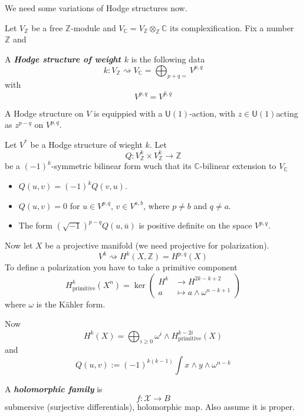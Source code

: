 We need some variations of Hodge structures now.

Let $V_{\mathbb{Z}}$ be a free $\mathbb{Z}$-module and $V_{\mathbb{C}}=V_{\mathbb{Z}}\otimes_{\mathbb{Z}}\mathbb{C}$ its complexification. Fix a number $\mathbb{Z}$ and

\begin{defn}\leavevmode
	A \textit{\textbf{Hodge structure of weight $k$}} is the following data
	\[k:V_\mathbb{Z}\rightsquigarrow V_{\mathbb{C}}=\bigoplus_{p+q=}  V^{p,q}\]
	with
	\[V^{p,q}=\overline{V^{p,q}}\]
\end{defn}

A Hodge structure on $V$ is equippied with a $\mathsf{U}(1)$-action, with $z\in\mathsf{U}(1)$acting as $z^{p-q}$ on $V^{p,q}$.

\begin{defn}\leavevmode
	Let $V^*$ be a Hodge structure of wieght $k$. Let
	\[Q:V_\mathbb{Z}^k\times V_{\mathbb{Z}}^k\to  \mathbb{Z}\]
	be a $(-1)^{k}$-symmetric bilinear form wuch that its $\mathbb{C}$-bilinear extension to $V_\mathbb{C}$
	\begin{itemize}
	\item $Q(u,v)=(-1)^{k} Q(v,u)$.
	\item $Q(u,v)=0$ for  $u\in V^{p,q}$, $v\in V^{a,b}$, where $p\neq b$ and $q\neq a$.
	\item The form $(\sqrt{-1})^{p-q} Q(u,\bar{u})$ is positive definite on the space $V^{p,q}$.
	\end{itemize}
\end{defn}

Now let $X$ be a projective manifold (we need projective for polarization).
\[V^k\rightsquigarrow H^{k}(X,\mathbb{Z})=H^{p,q}(X)\]
To define a polarization you have to take a primitive component 
\[H^k_{\operatorname{pr i m i ti v e}}(X^n)=\ker\left( \begin{aligned}
	H^k  &\longrightarrow H^{2k-k+2} \\
	a &\longmapsto a\wedge \omega^{n-k+1}
\end{aligned} \right) \]
where $ \omega$ is the Kähler form.

Now
\[H^{k}(X)=\bigoplus_{i\geq 0} \omega^i\wedge H^{k-2i}_{\operatorname{primitive}}(X) \]
and
\[Q(u,v):=(-1)^{k(k-1)} \int x\wedge y\wedge \omega^{n-k}\]

\begin{defn}\leavevmode
	A \textit{\textbf{holomorphic family}} is
	 \[f:\mathcal{X}\to B\]
	 submersive (surjective differentials), holomorphic map. Also assume it is proper.
\end{defn}

